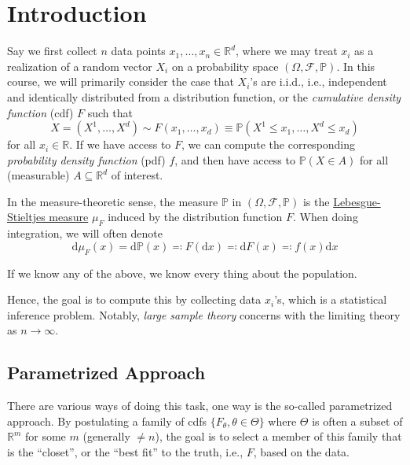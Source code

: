 \chapter{Introduction}
Say we first collect \(n\) data points \(x_1, \dots , x_n \in \mathbb{R} ^d\), where we may treat \(x_i\) as a realization of a random vector \(X_i\) on a probability space \((\Omega , \mathscr{F} , \mathbb{P} )\). In this course, we will primarily consider the case that \(X_i\)'s are i.i.d., i.e., independent and identically distributed from a distribution function, or the \emph{cumulative density function} (cdf) \(F\) such that
\[
	X = (X^1, \dots , X^d) \sim F(x_1, \dots , x_d) \equiv \mathbb{P} (X^1 \leq x_1, \dots , X^d \leq x_d )
\]
for all \(x_i \in \mathbb{R} \). If we have access to \(F\), we can compute the corresponding \emph{probability density function} (pdf) \(f\), and then have access to \(\mathbb{P} (X \in A)\) for all (measurable) \(A \subseteq \mathbb{R} ^d\) of interest.

\begin{notation}
	In the measure-theoretic sense, the measure \(\mathbb{P} \) in \((\Omega , \mathscr{F} , \mathbb{P} )\) is the \href{https://en.wikipedia.org/wiki/Lebesgue-Stieltjes_integration}{Lebesgue-Stieltjes measure} \(\mu _F\) induced by the distribution function \(F\). When doing integration, we will often denote
	\[
		\mathrm{d} \mu _F (x) = \mathrm{d} \mathbb{P}(x) \eqqcolon F(\mathrm{d} x) \eqqcolon \mathrm{d} F(x) \eqqcolon f(x) \mathrm{d} x
	\]
\end{notation}

\begin{remark}
	If we know any of the above, we know every thing about the population.
\end{remark}

Hence, the goal is to compute this by collecting data \(x_i\)'s, which is a statistical inference problem. Notably, \emph{large sample theory} concerns with the limiting theory as \(n \to \infty \).

\section{Parametrized Approach}
There are various ways of doing this task, one way is the so-called parametrized approach. By postulating a family of cdfs \(\{ F_\theta , \theta \in \Theta \} \) where \(\Theta \) is often a subset of \(\mathbb{R} ^m\) for some \(m\) (generally \(\neq n\)), the goal is to select a member of this family that is the ``closet'', or the ``best fit'' to the truth, i.e., \(F\), based on the data.

